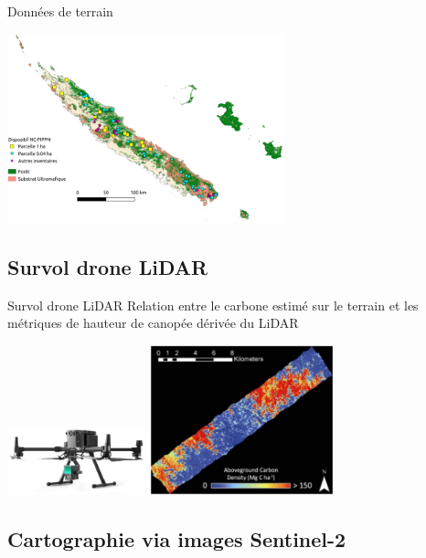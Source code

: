 \documentclass[10pt,table,dvipsnames,compress]{beamer}
\begin{document}
\begin{frame}[label={sec:orgcfdaa1f}]{Données de terrain}
\begin{center}
\includegraphics[width=0.6\textwidth]{figs/ncpippn-plots.png}
\end{center}
\end{frame}

\subsection{Survol drone LiDAR}
\label{sec:orgc9ef24d}

\begin{frame}[label={sec:org330fd7c}]{Survol drone LiDAR}
Relation entre le carbone estimé sur le terrain et les métriques de hauteur de canopée dérivée du LiDAR

\begin{center}
\includegraphics[width=0.3\textwidth]{figs/lidar-drone.jpg}
\includegraphics[width=0.4\textwidth]{figs/map-lidar.png}
\end{center}
\end{frame}

\subsection{Cartographie via images Sentinel-2}
\label{sec:org33f8373}
\end{document}
